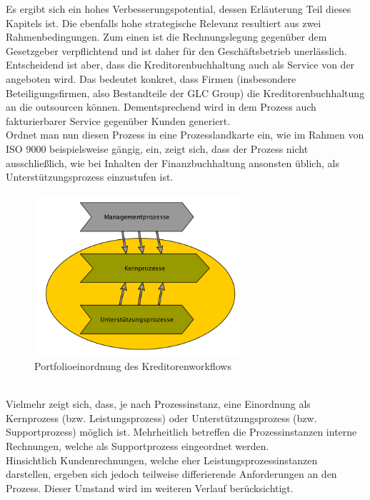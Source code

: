 Es ergibt sich ein hohes Verbesserungspotential, dessen Erläuterung Teil dieses Kapitels ist.
Die ebenfalls hohe strategische Relevanz resultiert aus zwei Rahmenbedingungen. 
Zum einen ist die Rechnungslegung gegenüber dem Gesetzgeber verpflichtend und ist daher für den Geschäftsbetrieb unerlässlich. 
Entscheidend ist aber, dass die Kreditorenbuchhaltung auch als Service von der \firma angeboten wird.
Das bedeutet konkret, dass Firmen (insbesondere Beteiligungsfirmen, also Bestandteile der GLC Group) die Kreditorenbuchhaltung an die \firma  outsourcen können. 
Dementsprechend wird in dem Prozess auch fakturierbarer Service gegenüber Kunden generiert.\\
Ordnet man nun diesen Prozess in eine Prozesslandkarte ein, wie im Rahmen von ISO 9000 beispielsweise gängig, ein, zeigt sich, dass der Prozess nicht ausschließlich, wie bei Inhalten der Finanzbuchhaltung ansonsten üblich, als Unterstützungsprozess einzustufen ist.\\
\begin{figure}[!htb]
\centering
\includegraphics[height=60mm]{images/prozesslandkarte}
\caption{Portfolioeinordnung des Kreditorenworkflows \protect\footnotemark}
\label{Portfolioeinordnung des Kreditorenworkflows}
\end{figure}
~\ \\Vielmehr zeigt sich, dass, je nach Prozessinstanz, eine Einordnung als Kernprozess (bzw. Leistungsprozess) oder Unterstützungsprozess (bzw. Supportprozess) möglich ist. 
Mehrheitlich betreffen die Prozessinstanzen interne Rechnungen, welche als Supportprozess eingeordnet werden. \\
Hinsichtlich Kundenrechnungen, welche eher Leistungsprozessinstanzen darstellen, ergeben sich jedoch teilweise differierende Anforderungen an den Prozess.
Dieser Umstand wird im weiteren Verlauf berücksichtigt.


